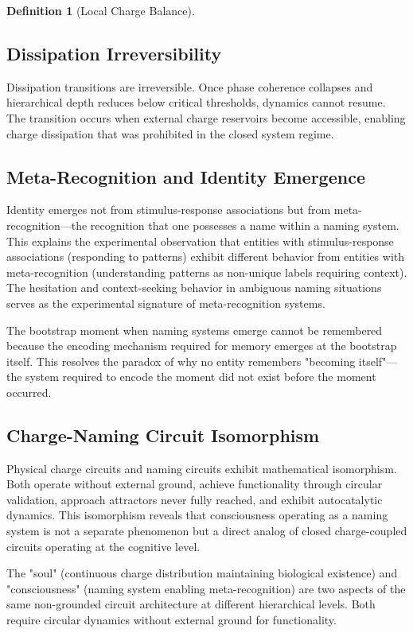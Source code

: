 \documentclass[12pt,a4paper]{article}
\theoremstyle{plain}
\theoremstyle{definition}
\newtheorem{definition}[theorem]{Definition}
\theoremstyle{remark}
\begin{document}
\begin{definition}[Local Charge Balance]
\subsection{Dissipation Irreversibility}

Dissipation transitions are irreversible. Once phase coherence collapses and hierarchical depth reduces below critical thresholds, dynamics cannot resume. The transition occurs when external charge reservoirs become accessible, enabling charge dissipation that was prohibited in the closed system regime.

\subsection{Meta-Recognition and Identity Emergence}

Identity emerges not from stimulus-response associations but from meta-recognition—the recognition that one possesses a name within a naming system. This explains the experimental observation that entities with stimulus-response associations (responding to patterns) exhibit different behavior from entities with meta-recognition (understanding patterns as non-unique labels requiring context). The hesitation and context-seeking behavior in ambiguous naming situations serves as the experimental signature of meta-recognition systems.

The bootstrap moment when naming systems emerge cannot be remembered because the encoding mechanism required for memory emerges at the bootstrap itself. This resolves the paradox of why no entity remembers "becoming itself"—the system required to encode the moment did not exist before the moment occurred.

\subsection{Charge-Naming Circuit Isomorphism}

Physical charge circuits and naming circuits exhibit mathematical isomorphism. Both operate without external ground, achieve functionality through circular validation, approach attractors never fully reached, and exhibit autocatalytic dynamics. This isomorphism reveals that consciousness operating as a naming system is not a separate phenomenon but a direct analog of closed charge-coupled circuits operating at the cognitive level.

The "soul" (continuous charge distribution maintaining biological existence) and "consciousness" (naming system enabling meta-recognition) are two aspects of the same non-grounded circuit architecture at different hierarchical levels. Both require circular dynamics without external ground for functionality.


\end{definition}
\end{document}

